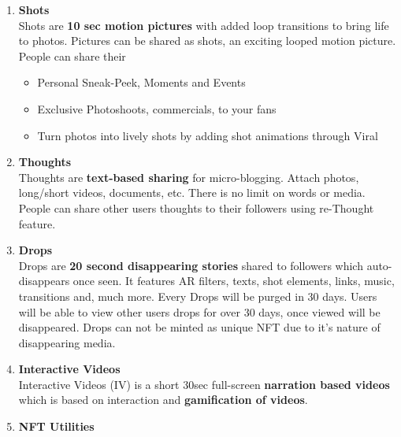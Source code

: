 \documentclass[conference]{IEEEtran}
\begin{document}
\begin{enumerate}[wide, labelwidth=!, labelindent=0pt]
\item \textbf{Shots}\\

Shots are \textbf{10 sec motion pictures} with added loop transitions to bring life to photos. Pictures can be shared as shots, an exciting looped motion picture.\\
People can share their
\begin{itemize}[wide, labelwidth=!, labelindent=0pt]
\item Personal Sneak-Peek, Moments and Events
\item Exclusive Photoshoots, commercials, to your fans
\item Turn photos into lively shots by adding shot animations through Viral
\end{itemize}



\item \textbf{Thoughts}\\

Thoughts are \textbf{text-based sharing} for micro-blogging. Attach photos, long/short videos, documents, etc. There is no limit on words or media. People can share other users thoughts to their followers using re-Thought feature.\\

\item \textbf{Drops}\\

Drops are \textbf{20 second disappearing stories} shared to followers which auto-disappears once seen. It features AR filters, texts, shot elements, links, music, transitions and, much more. Every Drops will be purged in 30 days. Users will be able to view other users drops for over 30 days, once viewed will be disappeared. Drops can not be minted as unique NFT due to it's nature of disappearing media.\\

\item \textbf{Interactive Videos}\\


Interactive Videos (IV) is a short 30sec full-screen \textbf{narration based videos} which is based on interaction and \textbf{gamification of videos}.\\


\item \textbf{NFT Utilities}\\



\end{enumerate}
\end{document}

